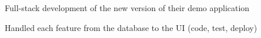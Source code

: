 \begin{MainPart}
{    \begin{ItemList}{\ColorHighlight}
      \item[\ding{226}] Full-stack development of the new version of their demo application
      \item[\ding{226}] Handled each feature from the database to the UI (code, test, deploy)
    \end{ItemList}
  }
\end{MainPart}